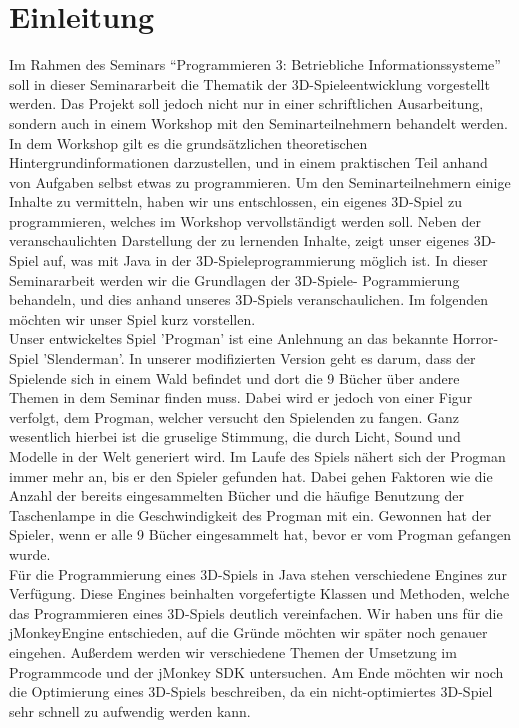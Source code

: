 \chapter{Einleitung}\label{ch:einleitung}
Im Rahmen des Seminars \enquote{Programmieren 3: Betriebliche Informationssysteme} soll in dieser Seminararbeit die Thematik der 3D-Spieleentwicklung vorgestellt werden. Das Projekt soll jedoch nicht nur in einer schriftlichen Ausarbeitung, sondern auch in einem Workshop mit den Seminarteilnehmern behandelt werden. In dem Workshop gilt es die grundsätzlichen theoretischen Hintergrundinformationen darzustellen, und in einem praktischen Teil anhand von Aufgaben selbst etwas zu programmieren. Um den Seminarteilnehmern einige Inhalte zu vermitteln, haben wir uns entschlossen, ein eigenes 3D-Spiel zu programmieren, welches im Workshop vervollständigt werden soll. Neben der veranschaulichten Darstellung der zu lernenden Inhalte, zeigt unser eigenes 3D-Spiel auf, was mit Java in der 3D-Spieleprogrammierung möglich ist. In dieser Seminararbeit werden wir die Grundlagen der 3D-Spiele- \newline
Pogrammierung behandeln, und dies anhand unseres 3D-Spiels veranschaulichen. Im folgenden möchten wir unser Spiel kurz vorstellen.\\

Unser entwickeltes Spiel 'Progman' ist eine Anlehnung an das bekannte Horror-Spiel 'Slenderman'. In unserer modifizierten Version geht es darum, dass der Spielende sich in einem Wald befindet und dort die 9 Bücher über andere Themen in dem Seminar finden muss. Dabei wird er jedoch von einer Figur verfolgt, dem Progman, welcher versucht den Spielenden zu fangen. Ganz wesentlich hierbei ist die gruselige Stimmung, die durch Licht, Sound und Modelle in der Welt generiert wird. Im Laufe des Spiels nähert sich der Progman immer mehr an, bis er den Spieler gefunden hat. Dabei gehen Faktoren wie die Anzahl der bereits eingesammelten Bücher und die häufige Benutzung der Taschenlampe in die Geschwindigkeit des Progman mit ein. Gewonnen hat der Spieler, wenn er alle 9 Bücher eingesammelt hat, bevor er vom Progman gefangen wurde. \\

Für die Programmierung eines 3D-Spiels in Java stehen verschiedene Engines zur Verfügung. Diese Engines beinhalten vorgefertigte Klassen und Methoden, welche das Programmieren eines 3D-Spiels deutlich vereinfachen. Wir haben uns für die jMonkeyEngine entschieden, auf die Gründe möchten wir später noch genauer eingehen. Außerdem werden wir verschiedene Themen der Umsetzung im Programmcode und der jMonkey SDK untersuchen. Am Ende möchten wir noch die Optimierung eines 3D-Spiels beschreiben, da ein nicht-optimiertes 3D-Spiel sehr schnell zu aufwendig werden kann.



